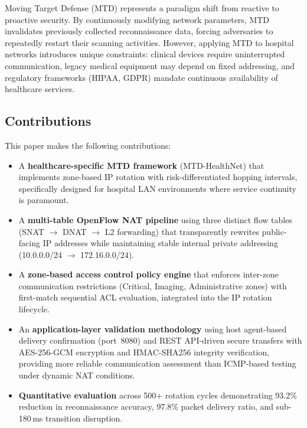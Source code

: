 \documentclass[conference]{IEEEtran}
\begin{document}
Moving Target Defense (MTD) represents a paradigm shift from reactive to proactive security. By continuously modifying network parameters, MTD invalidates previously collected reconnaissance data, forcing adversaries to repeatedly restart their scanning activities. However, applying MTD to hospital networks introduces unique constraints: clinical devices require uninterrupted communication, legacy medical equipment may depend on fixed addressing, and regulatory frameworks (HIPAA, GDPR) mandate continuous availability of healthcare services.

\subsection{Contributions}

This paper makes the following contributions:

\begin{itemize}
    \item A \textbf{healthcare-specific MTD framework} (MTD-HealthNet) that implements zone-based IP rotation with risk-differentiated hopping intervals, specifically designed for hospital LAN environments where service continuity is paramount.
    \item A \textbf{multi-table OpenFlow NAT pipeline} using three distinct flow tables (SNAT $\rightarrow$ DNAT $\rightarrow$ L2 forwarding) that transparently rewrites public-facing IP addresses while maintaining stable internal private addressing (10.0.0.0/24 $\rightarrow$ 172.16.0.0/24).
    \item A \textbf{zone-based access control policy engine} that enforces inter-zone communication restrictions (Critical, Imaging, Administrative zones) with first-match sequential ACL evaluation, integrated into the IP rotation lifecycle.
    \item An \textbf{application-layer validation methodology} using host agent-based delivery confirmation (port~8080) and REST API-driven secure transfers with AES-256-GCM encryption and HMAC-SHA256 integrity verification, providing more reliable communication assessment than ICMP-based testing under dynamic NAT conditions.
    \item \textbf{Quantitative evaluation} across 500+ rotation cycles demonstrating 93.2\% reduction in reconnaissance accuracy, 97.8\% packet delivery ratio, and sub-180\,ms transition disruption.
\end{itemize}

\end{document}
